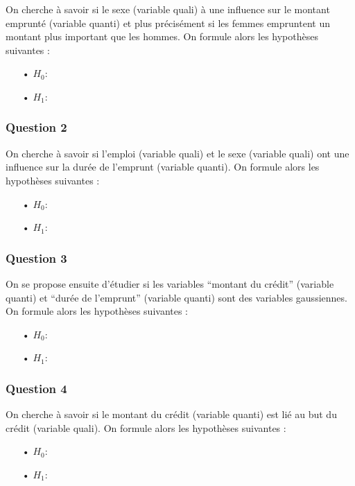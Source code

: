 \documentclass[
]{article}
\begin{document}
On cherche à savoir si le sexe (variable quali) à une influence sur le
montant emprunté (variable quanti) et plus précisément si les femmes
empruntent un montant plus important que les hommes. On formule alors
les hypothèses suivantes :

\begin{itemize}
\item[•] $H_0 :$ 
\item[•] $H_1 :$ 
\end{itemize}

\hypertarget{question-2}{%
\subsubsection{Question 2}\label{question-2}}

On cherche à savoir si l'emploi (variable quali) et le sexe (variable
quali) ont une influence sur la durée de l'emprunt (variable quanti). On
formule alors les hypothèses suivantes :

\begin{itemize}
\item[•] $H_0 :$ 
\item[•] $H_1 :$ 
\end{itemize}

\hypertarget{question-3}{%
\subsubsection{Question 3}\label{question-3}}

On se propose ensuite d'étudier si les variables ``montant du crédit''
(variable quanti) et ``durée de l'emprunt'' (variable quanti) sont des
variables gaussiennes. On formule alors les hypothèses suivantes :

\begin{itemize}
\item[•] $H_0 :$ 
\item[•] $H_1 :$ 
\end{itemize}

\hypertarget{question-4}{%
\subsubsection{Question 4}\label{question-4}}

On cherche à savoir si le montant du crédit (variable quanti) est lié au
but du crédit (variable quali). On formule alors les hypothèses
suivantes :

\begin{itemize}
\item[•] $H_0 :$ 
\item[•] $H_1 :$ 
\end{itemize}
\end{document}
